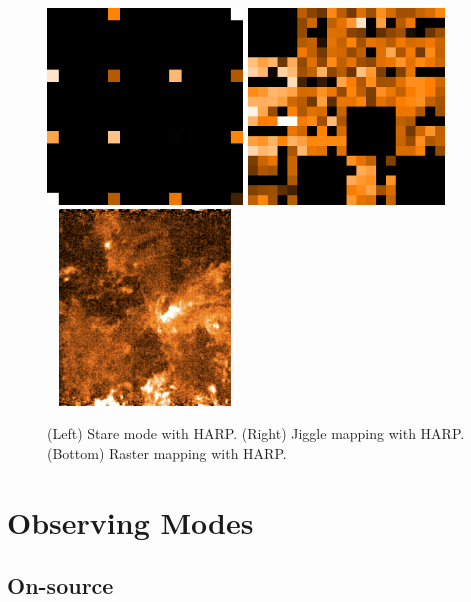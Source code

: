 \documentclass[11pt,oneside,chapters]{starlink}
\begin{document}
\begin{figure}[t!]
\begin{center}
\includegraphics[width=5.2cm, height=5.2cm]{sc20_stare}
\includegraphics[width=5.2cm, height=5.2cm]{sc20_jiggle}
\includegraphics[width=5.2cm, height=5.2cm]{sc20_raster}
\caption[Stare, jiggle and raster observing modes]{\label{fig:harpmodes}
  (Left) Stare mode with HARP. (Right) Jiggle mapping with HARP.
  (Bottom) Raster mapping with HARP.}
\end{center}
\end{figure}


\section{Observing Modes}
\label{sec:obsmodes}

\subsection{On-source}
\end{document}
